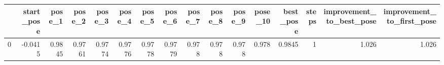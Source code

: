 \begin{tabular}{lrrrrrrrrrrrrrrr}
\toprule
{} &  start\_pose &  pose\_1 &  pose\_2 &  pose\_3 &  pose\_4 &  pose\_5 &  pose\_6 &  pose\_7 &  pose\_8 &  pose\_9 &  pose\_10 &  best\_pose &  steps &  improvement\_to\_best\_pose &  improvement\_to\_first\_pose \\
\midrule
0 &     -0.0415 &  0.9845 &  0.9761 &  0.9774 &  0.9776 &  0.9778 &  0.9779 &   0.978 &   0.978 &   0.978 &    0.978 &     0.9845 &      1 &                     1.026 &                      1.026 \\
\bottomrule
\end{tabular}

